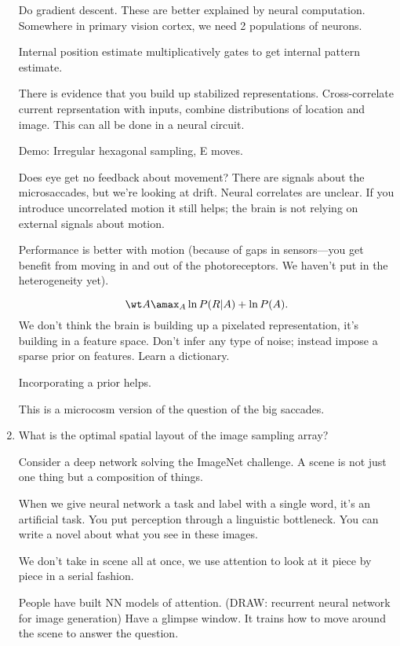 \begin{enumerate}
Do gradient descent. These are better explained by neural computation. Somewhere in primary vision cortex, we need 2 populations of neurons. 

Internal position estimate multiplicatively gates to get internal pattern estimate.

There is evidence that you build up stabilized representations. Cross-correlate current reprsentation with inputs, combine distributions of location and image. This can all be done in a neural circuit.

Demo: Irregular hexagonal sampling, E moves.

Does eye get no feedback about movement? There are signals about the microsaccades, but we're looking at drift. Neural correlates are unclear. If you introduce uncorrelated motion it still helps; the brain is not relying on external signals about motion.

Performance is better with motion (because of gaps in sensors---you get benefit from moving in and out of the photoreceptors. We haven't put in the heterogeneity yet). 

$$\wt A \amax_A \ln P(R|A) + \ln P(A).$$
We don't think the brain is building up a pixelated representation, it's building in a feature space. Don't infer any type of noise; instead impose a sparse prior on features. Learn a dictionary.

Incorporating a prior helps.

This is a microcosm version of the question of the big saccades. %
\item
What is the optimal spatial layout of the image sampling array?

Consider a deep network solving the ImageNet challenge. A scene is not just one thing but a composition of things. %

When we give neural network a task and label with a single word, it's an artificial task. You put perception through a linguistic bottleneck. %
You can write a novel about what you see in these images.

We don't take in scene all at once, we use attention to look at it piece by piece in a serial fashion. 

People have built NN models of attention. (DRAW: recurrent neural network for image generation) Have a glimpse window. It trains how to move around the scene to answer the question.


\end{enumerate}
